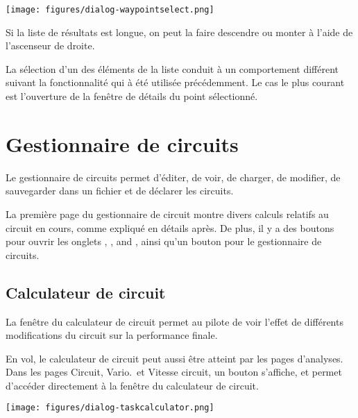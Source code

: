 \begin{center}
\texttt{[image: figures/dialog-waypointselect.png]}
\end{center}

Si la liste de résultats est longue, on peut la faire descendre ou monter à l'aide de l'ascenseur de droite. 

La sélection d'un des éléments de la liste conduit à un comportement différent suivant la fonctionnalité qui à été utilisée précédemment. Le cas le plus courant est l'ouverture de la fenêtre de détails du point sélectionné. 

\section{Gestionnaire de circuits}\label{sec:task-manager-dialog}

Le gestionnaire de circuits permet d'éditer, de voir, de charger, de modifier, de sauvegarder dans un fichier et de déclarer les circuits.

La première page du gestionnaire de circuit montre divers calculs
relatifs au circuit en cours, comme expliqué en détails après. De plus, il y a 
des boutons pour ouvrir les onglets
, ,
and , ainsi qu'un bouton pour  le gestionnaire de circuits.

\subsection*{Calculateur de circuit}\label{sec:task-calc-dial}
La fenêtre du calculateur de circuit permet au pilote de voir l'effet de
différents modifications du circuit sur la performance finale.

En vol, le calculateur de circuit peut aussi être atteint par les pages d'analyses.
Dans les pages Circuit, Vario.\ et Vitesse circuit, un bouton  s'affiche,
et permet d'accéder directement à la fenêtre du calculateur de circuit.

\begin{center}
\texttt{[image: figures/dialog-taskcalculator.png]}
\end{center}

